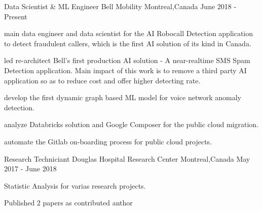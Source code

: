\documentclass[11pt, a4paper]{awesome-cv} %
\begin{document}





\begin{cventries}
	
	\cventry
	{Data Scientist \& ML Engineer} %
	{Bell Mobility} %
	{Montreal,Canada} %
	{June 2018 - Present} %
	{ %
		\begin{cvitems}
			\item {main data engineer and data scientist for the AI Robocall Detection application to detect fraudulent callers, which is the first AI solution of its kind in Canada.}
			\item {led re-architect Bell's first production AI solution - A near-realtime SMS Spam Detection application. Main impact of this work is to remove a third party AI application so as to reduce cost and offer higher detecting rate.}
			\item {develop the first  dynamic graph based ML model for voice network anomaly detection.}
			\item {analyze Databricks solution and Google Composer for the public cloud migration.}
            \item{automate the Gitlab on-boarding process for public cloud projects.}
		\end{cvitems}
	}
	
	\cventry
	{Research Techniciant} %
	{Douglas Hospital Research Center} %
	{Montreal,Canada} %
	{May 2017 - June 2018} %
	{ %
		\begin{cvitems}
			\item {Statistic Analysis for varias research projects.}
			\item {Published 2 papers as contributed anthor}
		\end{cvitems}
	}
	

\end{cventries}
\end{document}
